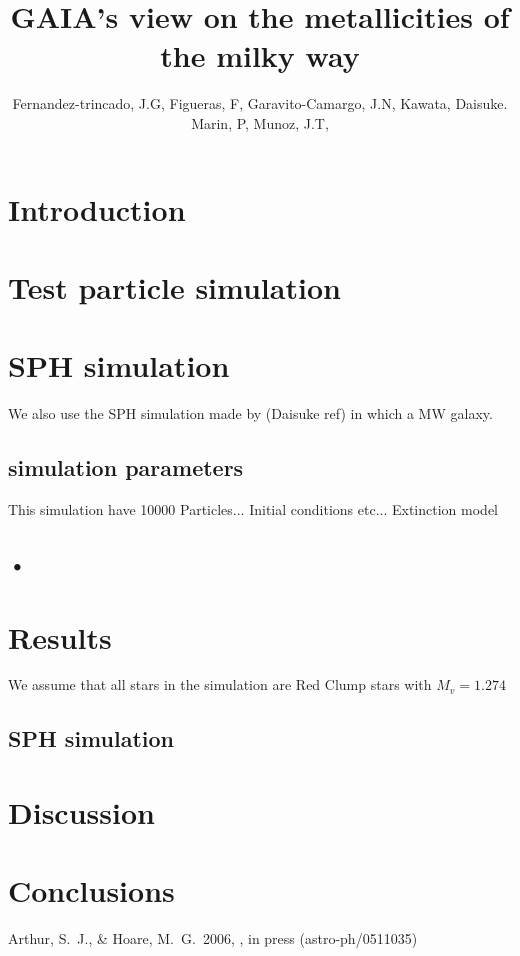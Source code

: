 \documentclass[proceedings, preprint]{rmaa}
\title{GAIA's view on the metallicities of the milky way}
\author{
  Fernandez-trincado, J.G,\altaffilmark{1} 
  Figueras, F, \altaffilmark{2}  
  Garavito-Camargo, J.N,\altaffilmark{3}
  Kawata, Daisuke. \altaffilmark{4}
  Marin, P,\altaffilmark{5}
  Munoz, J.T, \altaffilmark{6}}
\begin{document}
\maketitle


\section{Introduction}

\section{Test particle simulation}

\section{SPH simulation}

We also use the SPH simulation made by (Daisuke ref) in which a MW galaxy.

\subsection{simulation parameters}

This simulation have 10000 Particles...
Initial conditions etc...
Extinction model
\subsection{•}

\section{Results}

We assume that all stars in the simulation are Red Clump stars with $M_{v} = 1.274$


\subsection{SPH simulation}



\section{Discussion}

\section{Conclusions}

\begin{thebibliography}
 Arthur, S.~J., \&
Hoare, M.~G.\ 2006, \apj, in press (astro-ph/0511035)

\end{thebibliography}
\end{document}
